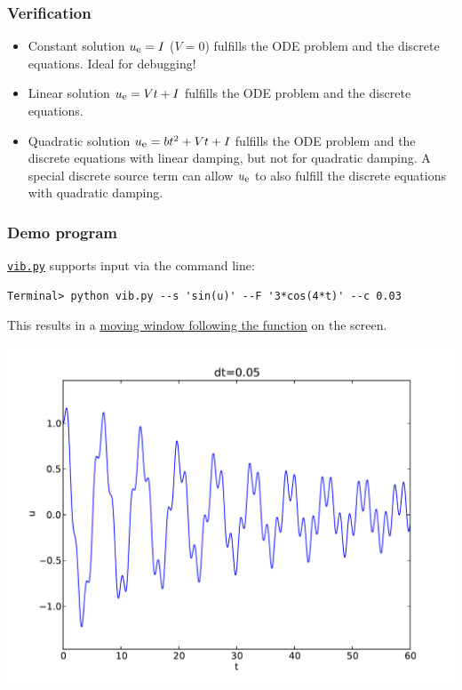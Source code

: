 \documentclass{beamer}
\begin{document}
\begin{frame}
\frametitle{Verification}

\label{vib:ode2:verify}

\begin{itemize}
 \item Constant solution $\uex = I$ ($V=0$) fulfills the ODE problem
   and the discrete equations. Ideal for debugging!

 \item Linear solution $\uex = Vt+I$ fulfills the ODE problem and
   the discrete equations.

 \item Quadratic solution $\uex = bt^2 + Vt + I$ fulfills the ODE
   problem and the discrete equations with linear damping, but not
   for quadratic damping.
   A special discrete source term can allow $\uex$ to also fulfill
   the discrete equations with quadratic damping.
\end{itemize}

\noindent
\end{frame}

\begin{frame}
\frametitle{Demo program}

\href{{http://tinyurl.com/nm5587k/vib/vib.py}}{\nolinkurl{vib.py}} supports input via the command line:

\begin{verbatim}
Terminal> python vib.py --s 'sin(u)' --F '3*cos(4*t)' --c 0.03
\end{verbatim}
This results in a \href{{http://tinyurl.com/opdfafk/pub/mov-vib/vib_generalized_dt0.05/index.html}}{moving window following the function} on the screen.



\centerline{\includegraphics[width=0.9\linewidth]{fig-vib/vib_gen_demo.pdf}}
\end{frame}
\end{document}
